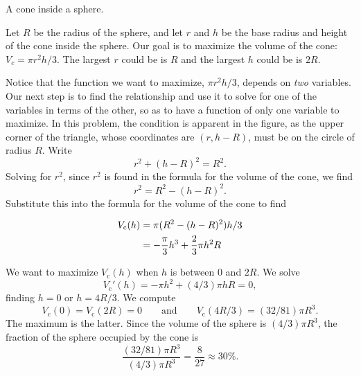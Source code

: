 \begin{marginfigure}
\caption{A cone inside a sphere.}
\label{fig:cone-sphere}
\end{marginfigure}

\begin{solution}
Let $R$ be the radius of the sphere, and let $r$ and $h$ be the base
radius and height of the cone inside the sphere.  Our goal is to
maximize the volume of the cone: $V_c=\pi r^2h/3$.  The largest $r$
could be is $R$ and the largest $h$ could be is $2R$.

Notice that the function we want to maximize, $\pi r^2h/3$, depends on
\textit{two} variables.  Our next step is to find the relationship and
use it to solve for one of the variables in terms of the other, so as
to have a function of only one variable to maximize.  In this problem,
the condition is apparent in the figure, as the upper corner of the
triangle, whose coordinates are $(r,h-R)$, must be on the circle of
radius $R$. Write
\[
r^2 + (h-R)^2=R^2.
\] 
Solving for $r^2$, since $r^2$ is found in the formula for the volume
of the cone, we find 
\[
r^2=R^2-(h-R)^2.
\]  
Substitute this into the formula for the volume of the cone to find

\begin{align*}
 V_{\text{c}}(h)&=\pi(R^2-(h-R)^2)h/3 \\
&=-{\pi\over3}h^3+{2\over3}\pi h^2R
\end{align*}

We want to maximize $V_{\text{c}}(h)$ when $h$ is between 0 and $2R$.  We
solve 
\[
V_{\text{c}}'(h)=-\pi h^2+(4/3)\pi h R=0,
\] 
finding $h=0$ or $h=4R/3$.  We compute
\[
V_{\text{c}}(0)=V_{\text{c}}(2R)=0\qquad\text{and}\qquad V_{\text{c}}(4R/3)=(32/81)\pi R^3.
\] 
The maximum is the latter. Since the volume of the sphere is $(4/3)\pi
R^3$, the fraction of the sphere occupied by the cone is
\[
\frac{(32/81)\pi R^3}{(4/3)\pi R^3}=\frac{8}{27}\approx 30\%.
\]
\end{solution}






